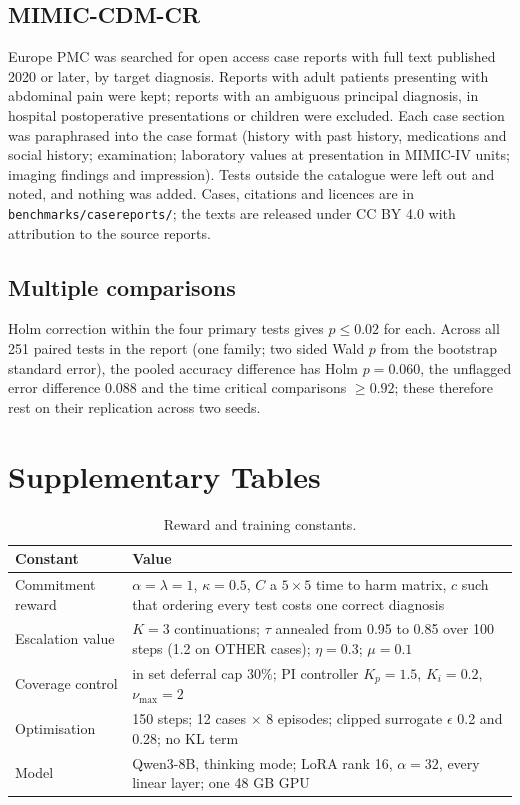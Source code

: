 \documentclass[11pt]{article}
\begin{document}
\subsection*{MIMIC-CDM-CR}
Europe PMC was searched for open access case reports with full text published 2020 or later, by target diagnosis. Reports with adult patients presenting with abdominal pain were kept; reports with an ambiguous principal diagnosis, in hospital postoperative presentations or children were excluded. Each case section was paraphrased into the case format (history with past history, medications and social history; examination; laboratory values at presentation in MIMIC-IV units; imaging findings and impression). Tests outside the catalogue were left out and noted, and nothing was added. Cases, citations and licences are in \texttt{benchmarks/casereports/}; the texts are released under CC BY 4.0 with attribution to the source reports.

\subsection*{Multiple comparisons}
Holm correction within the four primary tests gives $p \le 0.02$ for each. Across all 251 paired tests in the report (one family; two sided Wald $p$ from the bootstrap standard error), the pooled accuracy difference has Holm $p = 0.060$, the unflagged error difference 0.088 and the time critical comparisons $\ge 0.92$; these therefore rest on their replication across two seeds.

\section*{Supplementary Tables}

\begin{table}[H]
\caption{Reward and training constants.}
\small
\begin{tabularx}{\linewidth}{@{}lL@{}}
\toprule
Constant & Value \\
\midrule
Commitment reward & $\alpha = \lambda = 1$, $\kappa = 0.5$, $C$ a $5 \times 5$ time to harm matrix, $c$ such that ordering every test costs one correct diagnosis \\
Escalation value & $K = 3$ continuations; $\tau$ annealed from 0.95 to 0.85 over 100 steps (1.2 on OTHER cases); $\eta = 0.3$; $\mu = 0.1$ \\
Coverage control & in set deferral cap 30\%; PI controller $K_p = 1.5$, $K_i = 0.2$, $\nu_{\max} = 2$ \\
Optimisation & 150 steps; 12 cases $\times$ 8 episodes; clipped surrogate $\epsilon$ 0.2 and 0.28; no KL term \\
Model & Qwen3-8B, thinking mode; LoRA rank 16, $\alpha = 32$, every linear layer; one 48 GB GPU \\
\bottomrule
\end{tabularx}
\end{table}
\end{document}
